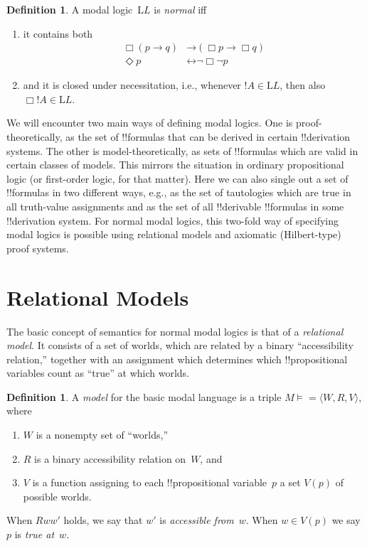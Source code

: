 \documentclass[10pt,a4paper]{article}
\theoremstyle{plain}
\theoremstyle{definition}
\newtheorem{defn}[thm]{Definition}
\theoremstyle{remark}
\newcommand*{\olfileid}[3]{}
\newcommand*{\olsection}[1]{\section*{#1}}
\providecommand{\lif}{\mathbin{\rightarrow}}
\providecommand{\mModel}[2]{\ensuremath{#1 \models #2}}
\providecommand{\Log}{\ensuremath{\mathrm{L}}}
\providecommand{\tuple}[1]{\langle #1 \rangle}
\providecommand{\liff}{\mathbin{\leftrightarrow}}
\begin{document}
\begin{defn}\label{defn:normal-modal-logic}
A modal logic~$\Log L$ is \emph{normal} iff 
\begin{enumerate}
\item it contains both
\begin{align}
\tag{K} \Box(p \lif q) & \lif (\Box p \lif \Box q) \\
\tag{Dual} \Diamond p & \liff \lnot \Box \lnot p
\end{align}
\item and it is closed under necessitation, i.e., whenever $!A \in
  \Log L$, then also $\Box !A \in \Log L$.
\end{enumerate}
\end{defn}

We will encounter two main ways of defining modal logics.  One is
proof-theoretically, as the set of !!{formula}s that can be derived in
certain !!{derivation} systems. The other is model-theoretically, as
sets of !!{formula}s which are valid in certain classes of
models. This mirrors the situation in ordinary propositional logic (or
first-order logic, for that matter).  Here we can also single out a
set of !!{formula}s in two different ways, e.g., as the set of
tautologies which are true in all truth-value assignments and as the
set of all !!{derivable} !!{formula}s in some !!{derivation} system.
For normal modal logics, this two-fold way of specifying modal logics
is possible using relational models and axiomatic (Hilbert-type) proof
systems.




\olfileid{nml}{syn}{rel}

\olsection{Relational Models}

The basic concept of semantics for normal modal logics is that of a
\emph{relational model}. It consists of a set of worlds, which are
related by a binary ``accessibility relation,'' together with an
assignment which determines which !!{propositional variable}s count as
``true'' at which worlds.

\begin{defn}
  A \emph{model} for the basic modal language is a triple $\mModel{M}
  = \tuple{W, R, V}$, where
  \begin{enumerate}
  \item $W$ is a nonempty set of ``worlds,''
  \item $R$ is a binary accessibility relation on~$W$, and
  \item $V$ is a function assigning to each !!{propositional
    variable}~$p$ a set $V(p)$ of possible worlds.
  \end{enumerate}
  When $Rww'$ holds, we say that $w'$ is \emph{accessible
    from}~$w$. When $w \in V(p)$ we say $p$ is \emph{true at}~$w$.
\end{defn}
\end{document}
